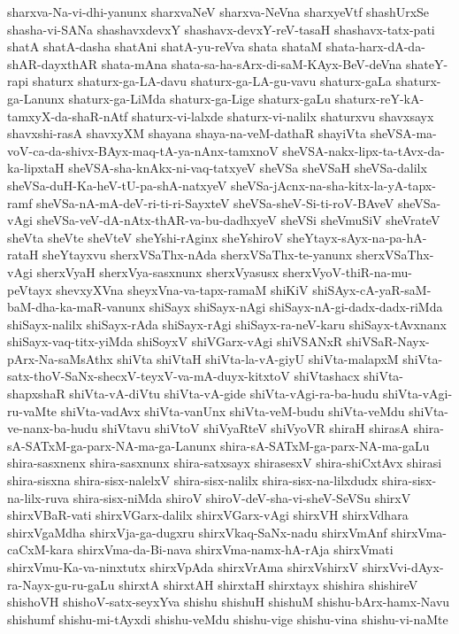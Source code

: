 {sharxva-Na-vi-dhi-yanunx
sharxvaNeV
sharxva-NeVna
sharxyeVtf
shashUrxSe
shasha-vi-SANa
shashavxdevxY
shashavx-devxY-reV-tasaH
shashavx-tatx-pati
shatA
shatA-dasha
shatAni
shatA-yu-reVva
shata
shataM
shata-harx-dA-da-shAR-dayxthAR
shata-mAna
shata-sa-ha-sArx-di-saM-KAyx-BeV-deVna
shateY-rapi
shaturx
shaturx-ga-LA-davu
shaturx-ga-LA-gu-vavu
shaturx-gaLa
shaturx-ga-Lanunx
shaturx-ga-LiMda
shaturx-ga-Lige
shaturx-gaLu
shaturx-reY-kA-tamxyX-da-shaR-nAtf
shaturx-vi-lalxde
shaturx-vi-nalilx
shaturxvu
shavxsayx
shavxshi-rasA
shavxyXM
shayana
shaya-na-veM-dathaR
shayiVta
sheVSA-ma-voV-ca-da-shivx-BAyx-maq-tA-ya-nAnx-tamxnoV
sheVSA-nakx-lipx-ta-tAvx-da-ka-lipxtaH
sheVSA-sha-knAkx-ni-vaq-tatxyeV
sheVSa
sheVSaH
sheVSa-dalilx
sheVSa-duH-Ka-heV-tU-pa-shA-natxyeV
sheVSa-jAcnx-na-sha-kitx-la-yA-tapx-ramf
sheVSa-nA-mA-deV-ri-ti-ri-SayxteV
sheVSa-sheV-Si-ti-roV-BAveV
sheVSa-vAgi
sheVSa-veV-dA-nAtx-thAR-va-bu-dadhxyeV
sheVSi
sheVmuSiV
sheVrateV
sheVta
sheVte
sheVteV
sheYshi-rAginx
sheYshiroV
sheYtayx-sAyx-na-pa-hA-rataH
sheYtayxvu
sherxVSaThx-nAda
sherxVSaThx-te-yanunx
sherxVSaThx-vAgi
sherxVyaH
sherxVya-sasxnunx
sherxVyasusx
sherxVyoV-thiR-na-mu-peVtayx
shevxyXVna
sheyxVna-va-tapx-ramaM
shiKiV
shiSAyx-cA-yaR-saM-baM-dha-ka-maR-vanunx
shiSayx
shiSayx-nAgi
shiSayx-nA-gi-dadx-dadx-riMda
shiSayx-nalilx
shiSayx-rAda
shiSayx-rAgi
shiSayx-ra-neV-karu
shiSayx-tAvxnanx
shiSayx-vaq-titx-yiMda
shiSoyxV
shiVGarx-vAgi
shiVSANxR
shiVSaR-Nayx-pArx-Na-saMsAthx
shiVta
shiVtaH
shiVta-la-vA-giyU
shiVta-malapxM
shiVta-satx-thoV-SaNx-shecxV-teyxV-va-mA-duyx-kitxtoV
shiVtashacx
shiVta-shapxshaR
shiVta-vA-diVtu
shiVta-vA-gide
shiVta-vAgi-ra-ba-hudu
shiVta-vAgi-ru-vaMte
shiVta-vadAvx
shiVta-vanUnx
shiVta-veM-budu
shiVta-veMdu
shiVta-ve-nanx-ba-hudu
shiVtavu
shiVtoV
shiVyaRteV
shiVyoVR
shiraH
shirasA
shira-sA-SATxM-ga-parx-NA-ma-ga-Lanunx
shira-sA-SATxM-ga-parx-NA-ma-gaLu
shira-sasxnenx
shira-sasxnunx
shira-satxsayx
shirasesxV
shira-shiCxtAvx
shirasi
shira-sisxna
shira-sisx-nalelxV
shira-sisx-nalilx
shira-sisx-na-lilxdudx
shira-sisx-na-lilx-ruva
shira-sisx-niMda
shiroV
shiroV-deV-sha-vi-sheV-SeVSu
shirxV
shirxVBaR-vati
shirxVGarx-dalilx
shirxVGarx-vAgi
shirxVH
shirxVdhara
shirxVgaMdha
shirxVja-ga-dugxru
shirxVkaq-SaNx-nadu
shirxVmAnf
shirxVma-caCxM-kara
shirxVma-da-Bi-nava
shirxVma-namx-hA-rAja
shirxVmati
shirxVmu-Ka-va-ninxtutx
shirxVpAda
shirxVrAma
shirxVshirxV
shirxVvi-dAyx-ra-Nayx-gu-ru-gaLu
shirxtA
shirxtAH
shirxtaH
shirxtayx
shishira
shishireV
shishoVH
shishoV-satx-seyxYva
shishu
shishuH
shishuM
shishu-bArx-hamx-Navu
shishumf
shishu-mi-tAyxdi
shishu-veMdu
shishu-vige
shishu-vina
shishu-vi-naMte
}
